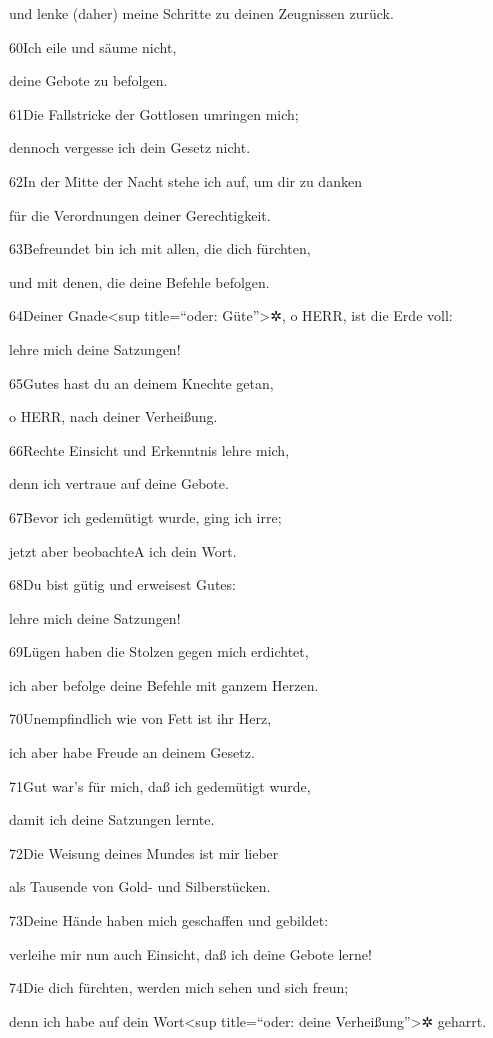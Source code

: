 und lenke (daher) meine Schritte zu deinen Zeugnissen zurück.

60Ich eile und säume nicht,

deine Gebote zu befolgen.

61Die Fallstricke der Gottlosen umringen mich;

dennoch vergesse ich dein Gesetz nicht.

62In der Mitte der Nacht stehe ich auf, um dir zu danken

für die Verordnungen deiner Gerechtigkeit.

63Befreundet bin ich mit allen, die dich fürchten,

und mit denen, die deine Befehle befolgen.

64Deiner Gnade\textless sup title=``oder: Güte''\textgreater✲, o HERR,
ist die Erde voll:

lehre mich deine Satzungen!

65Gutes hast du an deinem Knechte getan,

o HERR, nach deiner Verheißung.

66Rechte Einsicht und Erkenntnis lehre mich,

denn ich vertraue auf deine Gebote.

67Bevor ich gedemütigt wurde, ging ich irre;

jetzt aber beobachte{A} ich dein Wort.

68Du bist gütig und erweisest Gutes:

lehre mich deine Satzungen!

69Lügen haben die Stolzen gegen mich erdichtet,

ich aber befolge deine Befehle mit ganzem Herzen.

70Unempfindlich wie von Fett ist ihr Herz,

ich aber habe Freude an deinem Gesetz.

71Gut war's für mich, daß ich gedemütigt wurde,

damit ich deine Satzungen lernte.

72Die Weisung deines Mundes ist mir lieber

als Tausende von Gold- und Silberstücken.

73Deine Hände haben mich geschaffen und gebildet:

verleihe mir nun auch Einsicht, daß ich deine Gebote lerne!

74Die dich fürchten, werden mich sehen und sich freun;

denn ich habe auf dein Wort\textless sup title=``oder: deine
Verheißung''\textgreater✲ geharrt.

